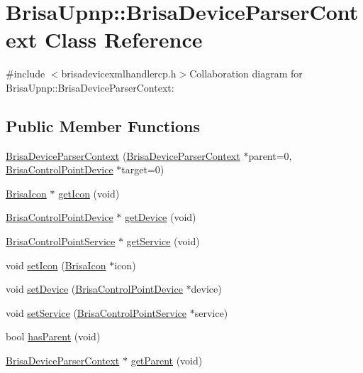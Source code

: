 \hypertarget{classBrisaUpnp_1_1BrisaDeviceParserContext}{
\section{BrisaUpnp::BrisaDeviceParserContext Class Reference}
\label{classBrisaUpnp_1_1BrisaDeviceParserContext}
}


{\ttfamily \#include $<$brisadevicexmlhandlercp.h$>$}Collaboration diagram for BrisaUpnp::BrisaDeviceParserContext:\subsection*{Public Member Functions}
\begin{DoxyCompactItemize}
\item 
\hyperlink{classBrisaUpnp_1_1BrisaDeviceParserContext_a791954f904323f932d133841b748b3f3}{BrisaDeviceParserContext} (\hyperlink{classBrisaUpnp_1_1BrisaDeviceParserContext}{BrisaDeviceParserContext} $\ast$parent=0, \hyperlink{classBrisaUpnp_1_1BrisaControlPointDevice}{BrisaControlPointDevice} $\ast$target=0)
\item 
\hyperlink{classBrisaUpnp_1_1BrisaIcon}{BrisaIcon} $\ast$ \hyperlink{classBrisaUpnp_1_1BrisaDeviceParserContext_a9990193a19efeef6de769eb3fb8d6907}{getIcon} (void)
\item 
\hyperlink{classBrisaUpnp_1_1BrisaControlPointDevice}{BrisaControlPointDevice} $\ast$ \hyperlink{classBrisaUpnp_1_1BrisaDeviceParserContext_a359313a9b2a0ba47f6a08883a45b69e8}{getDevice} (void)
\item 
\hyperlink{classBrisaUpnp_1_1BrisaControlPointService}{BrisaControlPointService} $\ast$ \hyperlink{classBrisaUpnp_1_1BrisaDeviceParserContext_addd9457a1394a11d2477187784c602f0}{getService} (void)
\item 
void \hyperlink{classBrisaUpnp_1_1BrisaDeviceParserContext_a7f472fae45ada97dc293bc9c1361558f}{setIcon} (\hyperlink{classBrisaUpnp_1_1BrisaIcon}{BrisaIcon} $\ast$icon)
\item 
void \hyperlink{classBrisaUpnp_1_1BrisaDeviceParserContext_a7b9d6fdb5d62eae2c35becaa91f15c84}{setDevice} (\hyperlink{classBrisaUpnp_1_1BrisaControlPointDevice}{BrisaControlPointDevice} $\ast$device)
\item 
void \hyperlink{classBrisaUpnp_1_1BrisaDeviceParserContext_a0e9813a93f47337012c0f0b3227632a4}{setService} (\hyperlink{classBrisaUpnp_1_1BrisaControlPointService}{BrisaControlPointService} $\ast$service)
\item 
bool \hyperlink{classBrisaUpnp_1_1BrisaDeviceParserContext_a8a10fb88e466282963b6eb6527aab058}{hasParent} (void)
\item 
\hyperlink{classBrisaUpnp_1_1BrisaDeviceParserContext}{BrisaDeviceParserContext} $\ast$ \hyperlink{classBrisaUpnp_1_1BrisaDeviceParserContext_adb64094f707661e92b1688b3d1919fc1}{getParent} (void)
\end{DoxyCompactItemize}
